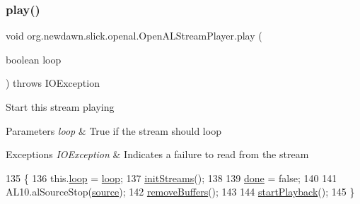 \subsubsection{\texorpdfstring{play()}{play()}}
{\footnotesize\ttfamily void org.\+newdawn.\+slick.\+openal.\+Open\+A\+L\+Stream\+Player.\+play (\begin{DoxyParamCaption}\item[{boolean}]{loop }\end{DoxyParamCaption}) throws I\+O\+Exception\hspace{0.3cm}{\ttfamily [inline]}}

Start this stream playing


\begin{DoxyParams}{Parameters}
{\em loop} & True if the stream should loop \\
\hline
\end{DoxyParams}

\begin{DoxyExceptions}{Exceptions}
{\em I\+O\+Exception} & Indicates a failure to read from the stream \\
\hline
\end{DoxyExceptions}

\begin{DoxyCode}
135                                                       \{
136         this.\mbox{\hyperlink{classorg_1_1newdawn_1_1slick_1_1openal_1_1_open_a_l_stream_player_a377b3e28ef63fca0134898a07b086e7f}{loop}} = \mbox{\hyperlink{classorg_1_1newdawn_1_1slick_1_1openal_1_1_open_a_l_stream_player_a377b3e28ef63fca0134898a07b086e7f}{loop}};
137         \mbox{\hyperlink{classorg_1_1newdawn_1_1slick_1_1openal_1_1_open_a_l_stream_player_a765f3c95de540350a0ed4902a6d9792a}{initStreams}}();
138         
139         \mbox{\hyperlink{classorg_1_1newdawn_1_1slick_1_1openal_1_1_open_a_l_stream_player_a64962f56b4c366c19fe3c2bff2f55842}{done}} = \textcolor{keyword}{false};
140 
141         AL10.alSourceStop(\mbox{\hyperlink{classorg_1_1newdawn_1_1slick_1_1openal_1_1_open_a_l_stream_player_abe9f7d1ac52a705aa359cf3eb1c69464}{source}});
142         \mbox{\hyperlink{classorg_1_1newdawn_1_1slick_1_1openal_1_1_open_a_l_stream_player_a6819d005f935905cb6c8419154ed05a5}{removeBuffers}}();
143         
144         \mbox{\hyperlink{classorg_1_1newdawn_1_1slick_1_1openal_1_1_open_a_l_stream_player_a42538934813aebc2b0b210953afc74d6}{startPlayback}}();
145     \}
\end{DoxyCode}
\mbox{\label{classorg_1_1newdawn_1_1slick_1_1openal_1_1_open_a_l_stream_player_a6819d005f935905cb6c8419154ed05a5}} 
